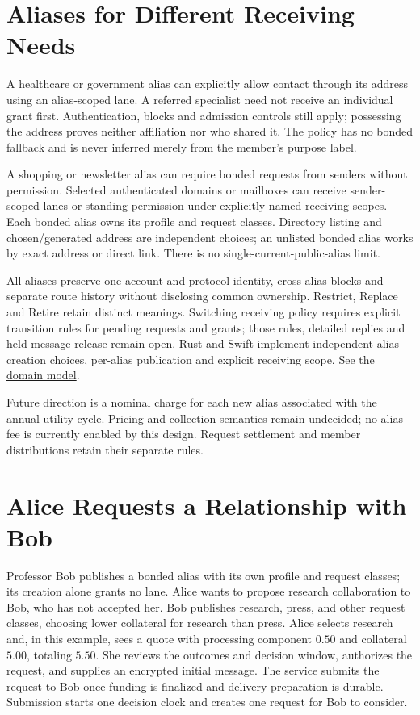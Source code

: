 \documentclass[11pt]{article}
\begin{document}
\section{Aliases for Different Receiving Needs}

A healthcare or government alias can explicitly allow contact through its address
using an alias-scoped lane. A referred specialist need not receive an individual
grant first. Authentication, blocks and admission controls still apply; possessing
the address proves neither affiliation nor who shared it. The policy has no bonded
fallback and is never inferred merely from the member's purpose label.

A shopping or newsletter alias can require bonded requests from senders without
permission. Selected authenticated domains or mailboxes can receive sender-scoped
lanes or standing permission under explicitly named receiving scopes. Each bonded
alias owns its profile and request classes. Directory listing and chosen/generated
address are independent choices; an unlisted bonded alias works by exact address
or direct link. There is no single-current-public-alias limit.

All aliases preserve one account and protocol identity, cross-alias blocks and
separate route history without disclosing common ownership. Restrict, Replace and
Retire retain distinct meanings. Switching receiving policy requires explicit
transition rules for pending requests and grants; those rules, detailed replies
and held-message release remain open. Rust and Swift implement independent alias
creation choices, per-alias publication and explicit receiving scope. See the \href{DOMAIN_MODEL.md}{domain model}.

Future direction is a nominal charge for each new alias associated with the annual
utility cycle. Pricing and collection semantics remain undecided; no alias fee is
currently enabled by this design. Request settlement and member distributions
retain their separate rules.


\section{Alice Requests a Relationship with Bob}

Professor Bob publishes a bonded alias with its own profile and request classes;
its creation alone grants no lane. Alice wants to propose research collaboration to Bob, who has not
accepted her. Bob publishes research, press, and other request classes, choosing
lower collateral for research than press. Alice selects research and, in this example, sees a quote
with processing component $0.50$ and collateral $5.00$, totaling $5.50$. She reviews the
outcomes and decision window, authorizes the request, and supplies an encrypted
initial message. The service submits the request to Bob once funding is finalized
and delivery preparation is durable. Submission starts one decision clock and
creates one request for Bob to consider.
\end{document}
